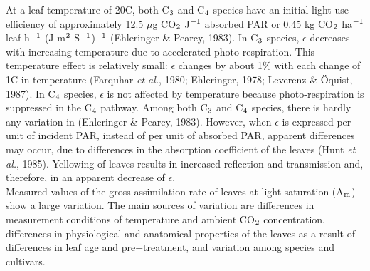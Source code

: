 At a leaf temperature of 20\degrees C, both C$_{{\rm 3}}$ and C$_{{\rm 4}}$ species have an initial light use efficiency
of approximately 12.5 $\mu$g CO$_{{\rm 2}}$ J$^{{\rm -1}}$ absorbed PAR or 0.45 kg CO$_{{\rm 2}}$ ha$^{{\rm -}{1}}$ leaf h$^{{\rm -}{1}}$ (J m$^{{\rm 2}}$ S$^{{\rm -}{1}}$)$^{{\rm -}{1}}$
(Ehleringer \& Pearcy, 1983). In C$_{{\rm 3}}$ species, $\epsilon$ decreases with increasing temperature due
to accelerated photo-respiration. This temperature effect is relatively small: $\epsilon$ changes by
about 1\% with each change of 1\degrees C in temperature (Farquhar {\it et al.\/}, 1980; Ehleringer,
1978; Leverenz \& \"{O}quist, 1987). In C$_{{\rm 4}}$ species, $\epsilon$ is not affected by temperature because
photo-respiration is suppressed in the C$_{{\rm 4}}$ pathway. Among both C$_{{\rm 3}}$ and C$_{{\rm 4}}$ species, there
is hardly any variation in (Ehleringer \& Pearcy, 1983). However, when $\epsilon$ is expressed per
unit of incident PAR, instead of per unit of absorbed PAR, apparent differences may
occur, due to differences in the absorption coefficient of the leaves (Hunt {\it et al.\/}, 1985).
Yellowing of leaves results in increased reflection and transmission and, therefore, in an
apparent decrease of $\epsilon$.  \\
Measured values of the gross assimilation rate of leaves at light saturation (A$_{{\rm m}}$) show a
large variation. The main sources of variation are differences in measurement conditions
of temperature and ambient CO$_{{\rm 2}}$ concentration, differences in physiologi\-cal and anatomi\-cal proper\-ties of the leaves as a result of differences in leaf age and pre$-$treatment, and
variation among species and cultivars.



